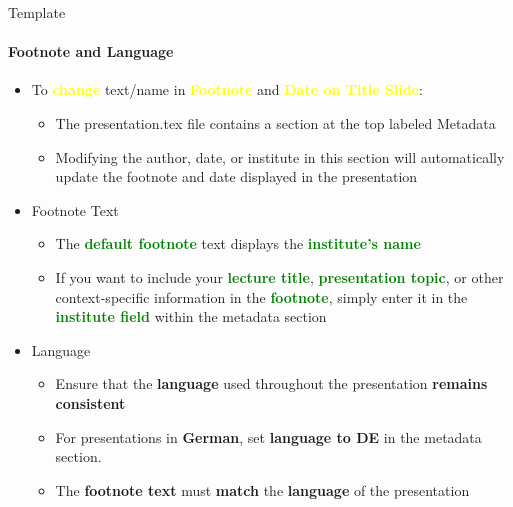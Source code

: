 \documentclass[aspectratio=169]{beamer}
\begin{document}
\begin{frame}{Template}
    \framesubtitle{Footnote and Language}

    
    \begin{minipage}{0.8\textwidth}  %
        \begin{itemize}
            \item To \textcolor{yellow}{\textbf{change}} text/name in \textcolor{yellow}{\textbf{Footnote}} and \textcolor{yellow}{\textbf{Date on Title Slide}}: 
            \vspace{-0.5\topsep}
            \begin{itemize}
                \item The presentation.tex file contains a section at the top labeled Metadata
                \item Modifying the author, date, or institute in this section will automatically update the footnote and date displayed in the presentation
            \end{itemize}
    
            \item Footnote Text
            \vspace{-0.5\topsep}
            \begin{itemize}
                \item The \textcolor{green}{\textbf{default footnote}} text displays the \textcolor{green}{\textbf{institute's name}}
                \item If you want to include your \textcolor{green}{\textbf{lecture title}}, \textcolor{green}{\textbf{presentation topic}}, or other context-specific information in the \textcolor{green}{\textbf{footnote}}, simply enter it in the \textcolor{green}{\textbf{institute field}} within the metadata section
            \end{itemize}
            
            \item Language
            \vspace{-0.5\topsep}
            \begin{itemize}
                \item Ensure that the \textcolor{iee}{\textbf{language}} used throughout the presentation \textcolor{iee}{\textbf{remains consistent}}
                \item For presentations in \textcolor{iee}{\textbf{German}}, set \textcolor{iee}{\textbf{language to DE}} in the metadata section.
                \item The \textcolor{iee}{\textbf{footnote text}} must \textcolor{iee}{\textbf{match}} the \textcolor{iee}{\textbf{language}} of the presentation
            \end{itemize}
        \end{itemize}
    \end{minipage}
\end{frame}
\end{document}
